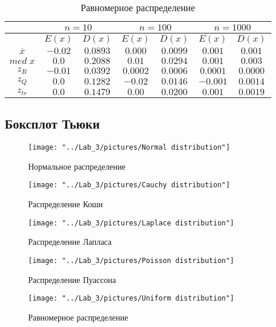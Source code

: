 \documentclass[12pt,a4paper]{article}
\begin{document}
		\newpage
		\begin{table}[H]
			\begin{center}
				\begin{tabular}{|c|c|c|c|c|c|c|}
					\hline
					& \multicolumn{2}{c|}{$n=10$} & \multicolumn{2}{c|}{$n=100$} & \multicolumn{2}{c|}{$n=1000$}\\
					\hline
					& $E(x)$ & $D(x)$ & $E(x)$ & $D(x)$ & $E(x)$ & $D(x)$\\
					\hline
					$\overline{x}$ & $-0.02$ & $0.0893$ & $0.000$ & $0.0099$ & $0.001$ & $0.001$\\
					\hline
					$med\;x$ & $0.0$ & $0.2088$ & $0.01$ & $0.0294$ & $0.001$ & $0.003$\\
					\hline
					$z_R$ & $-0.01$ & $0.0392$ & $0.0002$ & $0.0006$ & $0.0001$ & $0.0000$\\
					\hline
					$z_Q$ & $0.0$ & $0.1282$ & $-0.02$ & $0.0146$ & $-0.001$ & $0.0014$\\
					\hline
					$z_{tr}$ & $0.0$ & $0.1479$ & $0.00$ & $0.0200$ & $0.001$ & $0.0019$\\
					\hline
				\end{tabular}
			\end{center}
			\caption{Равномерное распределение}
		\end{table}

	\subsection{Боксплот Тьюки}
	\begin{center}
		\begin{figure}[H]
			\texttt{[image: "../Lab\_3/pictures/Normal distribution"]} 
			\caption[Нормальное распределение]{Нормальное распределение}
		\end{figure}
	
		\begin{figure}[H]
			\texttt{[image: "../Lab\_3/pictures/Cauchy distribution"]}
			\caption[Распределение Коши]{Распределение Коши}
			
			\texttt{[image: "../Lab\_3/pictures/Laplace distribution"]}
			\caption[Распределение Лапласа]{Распределение Лапласа}
		\end{figure}
		
		\begin{figure}[H]
			\texttt{[image: "../Lab\_3/pictures/Poisson distribution"]}
			\caption[Распределение Пуассона]{Распределение Пуассона}
			
			\texttt{[image: "../Lab\_3/pictures/Uniform distribution"]}
			\caption[Равномерное распределение]{Равномерное распределение}
		\end{figure}
	\end{center}
\end{document}
